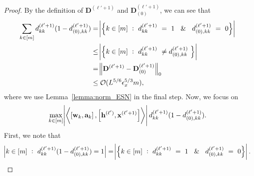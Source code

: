 \begin{proof}
	By the definition of $\mathbf{D}^{(\ell' + 1)}$ and $\mathbf{D}^{(\ell'+1)}_{(0)}$, we can see that
	\begingroup \allowdisplaybreaks
	\begin{align*}
		\sum_{k \in [m]} d^{(\ell'+1)}_{kk} (1 - d^{(
			\ell'+1)}_{(0), kk}) &= \abs{\left\{k \in [m] \text{ } : \text{ }  d^{(\ell'+1)}_{kk} \text{ }  =\text{ }  1 \text{ } \And \text{ }  d^{(\ell'+1)}_{(0), kk} \text{ }  = \text{ }  0 \right\}} \\&
		\le \abs{\left\{k \in [m] \text{ } : \text{ }  d^{(\ell'+1)}_{kk} \text{ } \ne   d^{(\ell'+1)}_{(0), kk} \text{ } \right\}} \\&
		= \norm{\mathbf{D}^{(\ell'+1)} - \mathbf{D}^{(\ell'+1)}_{(0)}}_{0} \\& \le \mathcal{O}(L^{5/6} \epsilon_x^{5/3} m),
	\end{align*}
	\endgroup
	where we use Lemma~\ref{lemma:norm_ESN} in the final step. Now, we focus on 
	\begin{align*}
		\max_{k \in [m]} \abs{\left\langle \left[\mathbf{w}_k, \mathbf{a}_k\right],  \left[\mathbf{h}^{(\ell')}, \mathbf{x}^{(\ell'+1)}\right] \right\rangle} d^{(\ell'+1)}_{kk} (1 - d^{(\ell'+1)}_{(0), kk}).
	\end{align*}
	First, we note that
	\begin{align*}
		\abs{k \in [m] \text{ } : \text{ } d^{(\ell'+1)}_{kk} (1 - d^{(\ell'+1)}_{(0), kk}) = 1} = \abs{\left\{k \in [m] \text{ } : \text{ }  d^{(\ell'+1)}_{kk} \text{ }  =\text{ }  1 \text{ } \And \text{ }  d^{(\ell'+1)}_{(0), kk} \text{ }  = \text{ }  0 \right\}}.

\end{align*}
\end{proof}
